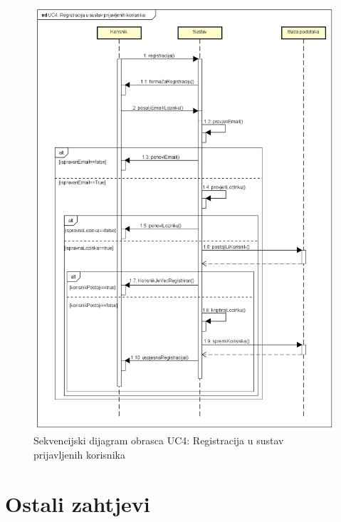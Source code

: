				\begin{figure}[H]
					\includegraphics[width=\textwidth]{slike/uc4Sekvencijski.PNG} %
					\caption{Sekvencijski dijagram obrasca UC4: Registracija u sustav prijavljenih korisnika}
					\label{fig:uc4-sekvencijski} %
				\end{figure}
				\eject
				
		\section{Ostali zahtjevi}
		 
